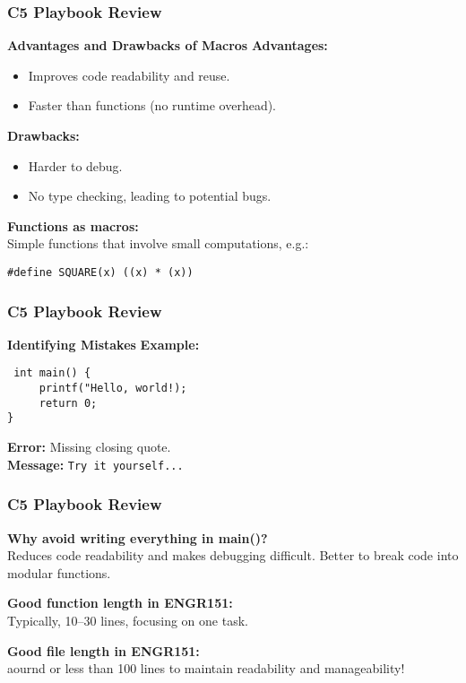 \documentclass[
	11pt, %
]{beamer}
\begin{document}
	\begin{frame}
	\frametitle{C5 Playbook Review}
	\textbf{ Advantages and Drawbacks of Macros}
	\textbf{Advantages:}
	\begin{itemize}
		\item Improves code readability and reuse.
		\item Faster than functions (no runtime overhead).
	\end{itemize}
	
	\textbf{Drawbacks:}
	\begin{itemize}
		\item Harder to debug.
		\item No type checking, leading to potential bugs.
	\end{itemize}
	
	\textbf{Functions as macros:} \\
	Simple functions that involve small computations, e.g.:
	\begin{center}
	\texttt{\#define SQUARE(x) ((x) * (x))}
	\end{center}
	\end{frame}
	
	\begin{frame}
		\frametitle{C5 Playbook Review}
		\textbf{Identifying Mistakes}
	\textbf{Example:}

	\texttt{
	int main() \{ \\
	~~~~ printf("Hello, world!); \\
	~~~~ return 0; \\
	\}
	}

	\textbf{Error:} Missing closing quote. \\
	\textbf{Message:} \texttt{Try it yourself...}
	\end{frame}
	
	\begin{frame}
		\frametitle{C5 Playbook Review}
	\textbf{Why avoid writing everything in main()?} \\
	Reduces code readability and makes debugging difficult. Better to break code into modular functions.
	
	\textbf{Good function length in ENGR151:} \\
	Typically, 10–30 lines, focusing on one task.
	
	\textbf{Good file length in ENGR151:} \\
	aournd or less than 100 lines to maintain readability and manageability!
	\end{frame}
	
\end{document}
